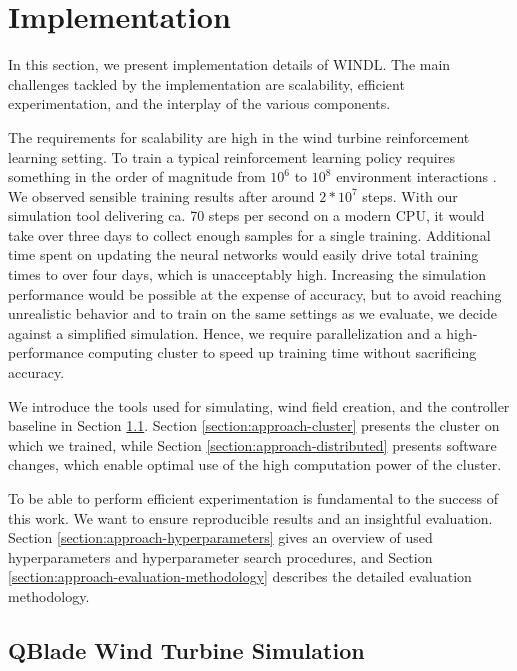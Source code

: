 \section{Implementation}
\label{section:approach-implementation}

\begin{summary}
In this section, we present implementation details of \ac{WINDL}. The main challenges tackled by the implementation are scalability, efficient experimentation, and the interplay of the various components.
\end{summary}

The requirements for scalability are high in the wind turbine reinforcement learning setting. To train a typical reinforcement learning policy requires something in the order of magnitude from $10^6$ to $10^8$ environment interactions \cite[Figure 3]{haarnojaSoftActorCriticOffPolicy2018} \cite[Methods: Training details]{mnihPlayingAtariDeep2013}. We observed sensible training results after around $2*10^7$ steps. With our simulation tool delivering ca. 70 steps per second on a modern CPU, it would take over three days to collect enough samples for a single training. Additional time spent on updating the neural networks would easily drive total training times to over four days, which is unacceptably high. Increasing the simulation performance would be possible at the expense of accuracy, but to avoid reaching unrealistic behavior and to train on the same settings as we evaluate, we decide against a simplified simulation. Hence, we require parallelization and a high-performance computing cluster to speed up training time without sacrificing accuracy.

We introduce the tools used for simulating, wind field creation, and the controller baseline in Section \ref{section:approach-qblade}. Section \ref{section:approach-cluster} presents the cluster on which we trained, while Section \ref{section:approach-distributed} presents software changes, which enable optimal use of the high computation power of the cluster.

To be able to perform efficient experimentation is fundamental to the success of this work. We want to ensure reproducible results and an insightful evaluation. Section \ref{section:approach-hyperparameters} gives an overview of used hyperparameters and hyperparameter search procedures, and Section \ref{section:approach-evaluation-methodology} describes the detailed evaluation methodology.


\subsection{QBlade Wind Turbine Simulation}
\label{section:approach-qblade}

